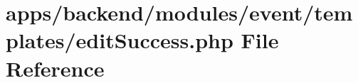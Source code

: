 \hypertarget{backend_2modules_2event_2templates_2edit_success_8php}{\section{apps/backend/modules/event/templates/edit\-Success.php File Reference}
\label{backend_2modules_2event_2templates_2edit_success_8php}
}
